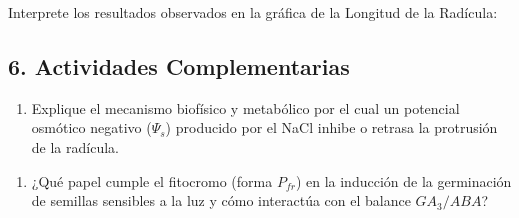 \documentclass[
  spanish,
  10pt,
  letterpaper,
  twocolumn]{article}
\providecommand{\tightlist}{%
  \setlength{\itemsep}{0pt}\setlength{\parskip}{0pt}}
\begin{document}
Interprete los resultados observados en la gráfica de la Longitud de la
Radícula:

\hrulefill

\hrulefill

\hrulefill

\hrulefill

\hrulefill

\subsection{6. Actividades
Complementarias}\label{actividades-complementarias}

\begin{enumerate}
\def\labelenumi{\arabic{enumi}.}
\tightlist
\item
  Explique el mecanismo biofísico y metabólico por el cual un potencial
  osmótico negativo (\(\Psi_s\)) producido por el NaCl inhibe o retrasa
  la protrusión de la radícula.
\end{enumerate}

\hrulefill

\hrulefill

\hrulefill

\hrulefill

\hrulefill

\hrulefill

\hrulefill

\hrulefill

\hrulefill

\hrulefill

\hrulefill

\hrulefill

\begin{enumerate}
\def\labelenumi{\arabic{enumi}.}
\setcounter{enumi}{1}
\tightlist
\item
  ¿Qué papel cumple el fitocromo (forma \(P_{fr}\)) en la inducción de
  la germinación de semillas sensibles a la luz y cómo interactúa con el
  balance \(GA_3 / ABA\)?
\end{enumerate}

\hrulefill

\hrulefill

\hrulefill

\hrulefill

\hrulefill

\hrulefill

\hrulefill

\hrulefill

\hrulefill
\end{document}
